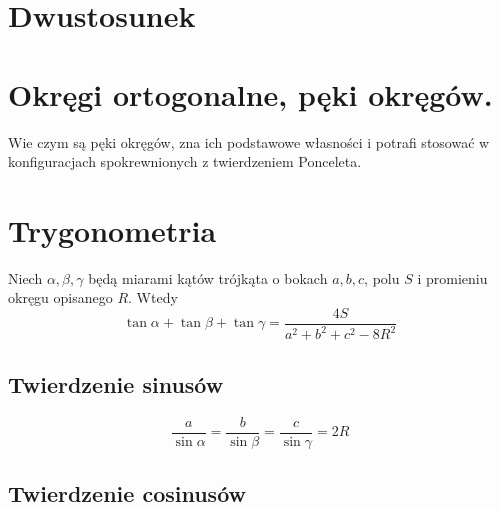 \section{Dwustosunek}

\section{Okręgi ortogonalne, pęki okręgów.}
Wie czym są pęki okręgów, zna ich podstawowe własności i potrafi stosować w konfiguracjach spokrewnionych z twierdzeniem Ponceleta.   




\section{Trygonometria}

\begin{proposition}
	Niech $\alpha, \beta, \gamma$ będą miarami kątów trójkąta o bokach $a, b, c$, polu $S$ i promieniu okręgu opisanego $R$.
	Wtedy
	\begin{equation}
		\tan \alpha + \tan \beta + \tan \gamma = \frac{4S}{a^2 + b^2 + c^2 - 8R^2}
	\end{equation}
\end{proposition}

\subsection{Twierdzenie sinusów}

$$\frac{a}{\sin \alpha} = \frac{b}{\sin \beta} = \frac{c}{\sin \gamma} = 2R$$


\subsection{Twierdzenie cosinusów}
%

%

